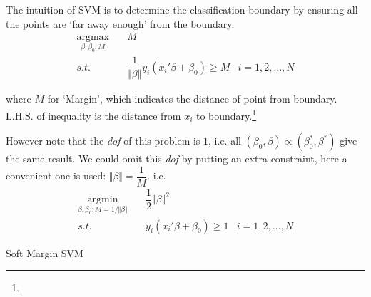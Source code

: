     The intuition of SVM is to determine the classification boundary by ensuring all the points are `far away enough' from the boundary.
\begin{equation*}
    \begin{aligned}
    \mathop{\arg\max}\limits_{\beta ,\beta _0,M}\quad &M\\
    s.t.\quad & \dfrac{1}{\Vert \beta  \Vert }y_i(x_i'\beta +\beta _0)\geq M&i=1,2,\ldots,N
    \end{aligned}
\end{equation*}

    where $ M $ for `Margin', which indicates the distance of point from boundary. $  \mathrm{L.H.S.} $ of inequality is the distance from $ x_i $ to boundary.\footnote{
    }

    However note that the \textit{dof} of this problem is $ 1 $, i.e. all $ (\beta_0,\beta) \propto (\beta _0^*,\beta ^*) $ give the same result. We could omit this \textit{dof} by putting an extra constraint, here a convenient one is used: $ \Vert \beta  \Vert =\dfrac{1}{M} $. i.e.
    \begin{equation*}
        \begin{aligned}
        \mathop{\arg\min}\limits_{\beta ,\beta _0:M=1/\Vert \beta  \Vert }\quad &\dfrac{1}{2}\Vert \beta  \Vert^2 \\
        s.t.\quad & y_i(x_i'\beta +\beta _0)\geq 1&i=1,2,\ldots,N
        \end{aligned}
    \end{equation*}

\begin{point}
    Soft Margin SVM
\end{point}

